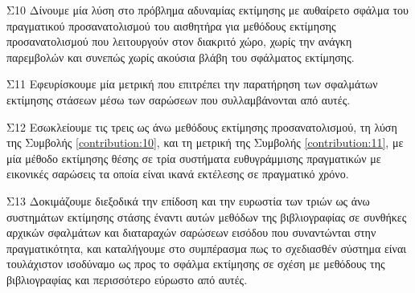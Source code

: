 \begin{bw_box}
\begin{customcontribution}{Σ10}
  \label{contribution:10}
  Δίνουμε μία λύση στο πρόβλημα αδυναμίας εκτίμησης με αυθαίρετο σφάλμα του
  πραγματικού προσανατολισμού του αισθητήρα για μεθόδους εκτίμησης
  προσανατολισμού που λειτουργούν στον διακριτό χώρο, χωρίς την ανάγκη
  παρεμβολών και συνεπώς χωρίς ακούσια βλάβη του σφάλματος εκτίμησης.
\end{customcontribution}
\end{bw_box}

\begin{bw_box}
\begin{customcontribution}{Σ11}
  \label{contribution:11}
  Εφευρίσκουμε μία μετρική που επιτρέπει την παρατήρηση των σφαλμάτων εκτίμησης
  στάσεων μέσω των σαρώσεων που συλλαμβάνονται από αυτές.
\end{customcontribution}
\end{bw_box}

\begin{bw_box}
\begin{customcontribution}{Σ12}
  \label{contribution:12}
  Εσωκλείουμε τις τρεις ως άνω μεθόδους εκτίμησης προσανατολισμού, τη λύση της
  Συμβολής \ref{contribution:10}, και τη μετρική της Συμβολής
  \ref{contribution:11}, με μία μέθοδο εκτίμησης θέσης σε τρία συστήματα
  ευθυγράμμισης πραγματικών με εικονικές σαρώσεις τα οποία είναι ικανά
  εκτέλεσης σε πραγματικό χρόνο.
\end{customcontribution}
\end{bw_box}

\begin{bw_box}
\begin{customcontribution}{Σ13}
  \label{contribution:13}
  Δοκιμάζουμε διεξοδικά την επίδοση και την ευρωστία των τριών ως άνω
  συστημάτων εκτίμησης στάσης έναντι αυτών μεθόδων της βιβλιογραφίας σε
  συνθήκες αρχικών σφαλμάτων και διαταραχών σαρώσεων εισόδου που συναντώνται
  στην πραγματικότητα, και καταλήγουμε στο συμπέρασμα πως το σχεδιασθέν
  σύστημα είναι τουλάχιστον ισοδύναμο ως προς το σφάλμα εκτίμησης σε σχέση
  με μεθόδους της βιβλιογραφίας και περισσότερο εύρωστο από αυτές.
\end{customcontribution}
\end{bw_box}



